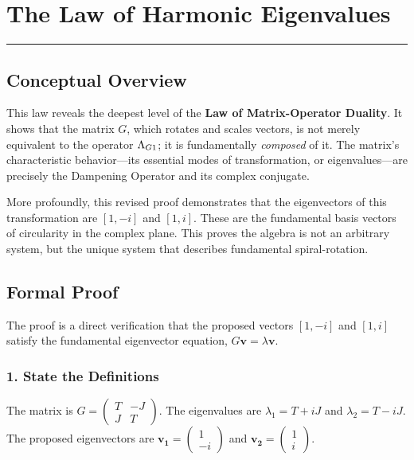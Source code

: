 
\section{The Law of Harmonic Eigenvalues}
\label{sec:harmonic_eigenvalues}
\hrule
\vspace{1em}


\subsection*{Conceptual Overview}
This law reveals the deepest level of the \textbf{Law of Matrix-Operator Duality}. It shows that the matrix $G$, which rotates and scales vectors, is not merely equivalent to the operator $\Lambda_{G1}$; it is fundamentally \textit{composed} of it. The matrix's characteristic behavior—its essential modes of transformation, or eigenvalues—are precisely the Dampening Operator and its complex conjugate.

More profoundly, this revised proof demonstrates that the eigenvectors of this transformation are $[1, -i]$ and $[1, i]$. These are the fundamental basis vectors of circularity in the complex plane. This proves the algebra is not an arbitrary system, but the unique system that describes fundamental spiral-rotation.

\subsection*{Formal Proof}
The proof is a direct verification that the proposed vectors $[1, -i]$ and $[1, i]$ satisfy the fundamental eigenvector equation, $G\mathbf{v} = \lambda\mathbf{v}$.

\subsubsection*{1. State the Definitions}
The matrix is $G = \begin{pmatrix} T & -J \\ J & T \end{pmatrix}$. The eigenvalues are $\lambda_1 = T+iJ$ and $\lambda_2 = T-iJ$. The proposed eigenvectors are $\mathbf{v_1} = \begin{pmatrix} 1 \\ -i \end{pmatrix}$ and $\mathbf{v_2} = \begin{pmatrix} 1 \\ i \end{pmatrix}$.

